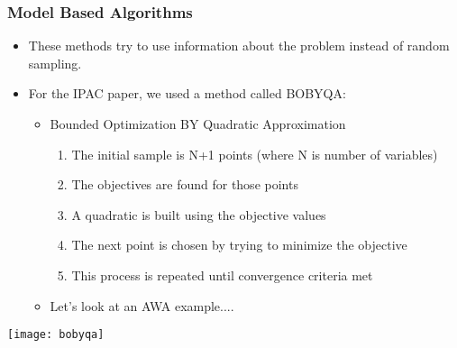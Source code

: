 \documentclass{beamer}
\begin{document}
\begin{frame}
	\frametitle{Model Based Algorithms}
			\begin{itemize}
			\item These methods try to use information about the problem instead of random sampling.
			\item For the IPAC paper, we used a method called BOBYQA:
			\begin{itemize}
				\item Bounded Optimization BY Quadratic Approximation
				\begin{enumerate}
					\item The initial sample is N+1 points (where N is number of variables)
					\item The objectives are found for those points
					\item A quadratic is built using the objective values
					\item The next point is chosen by trying to minimize the objective
					\item This process is repeated until convergence criteria met
				\end{enumerate}
				
				\item Let's look at an AWA example....
			\end{itemize}
		\end{itemize}
	\vspace*{-\baselineskip}
	\begin{center}
		\texttt{[image: bobyqa]}
	\end{center}
\end{frame}

\end{document}
